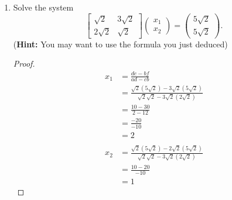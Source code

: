 \documentclass[11pt]{scrartcl}
\begin{document}
\begin{enumerate}[label=\alph*.]
{\begin{proof}
\[		      \]
		      So the condition of the solution is, $$x_2 = \frac{e}{b} = \frac{f}{d}$$
		      Thus, there exists a infinite amount of solution.
	      \end{proof}
	      }
	\item{
	      Solve the system
	      \begin{equation}
		      \left [ \begin{array}{cc}
				      \sqrt{2}  & 3\sqrt{2} \\
				      2\sqrt{2} & \sqrt{2}
			      \end{array} \right ] \left ( \begin{array}{c}
				      x_1 \\
				      x_2
			      \end{array} \right ) = \left ( \begin{array}{c}
				      5\sqrt{2} \\
				      5\sqrt{2}
			      \end{array} \right ).
	      \end{equation}
	      (\textbf{Hint:} You may want to use the formula you just deduced)
	      }
	      \begin{proof}
		      \begin{align*}
			      x_1 & = \frac{de-bf}{ad-cb}                                                        \\
			          & = \frac{\sqrt2(5\sqrt2) - 3\sqrt2(5\sqrt2)}{\sqrt2\sqrt2 - 3\sqrt2(2\sqrt2)} \\
			          & = \frac{10 - 30}{2-12}                                                       \\
			          & = \frac{-20}{-10}                                                            \\
			          & = 2                                                                          \\
			          &                                                                              \\
			      x_2 & = \frac{\sqrt2(5\sqrt2) - 2\sqrt2(5\sqrt2)}{\sqrt2\sqrt2 - 3\sqrt2(2\sqrt2)} \\
			          & = \frac{10-20}{-10}                                                          \\
			          & = 1
		      \end{align*}
	      \end{proof}
\end{enumerate}
\end{document}
